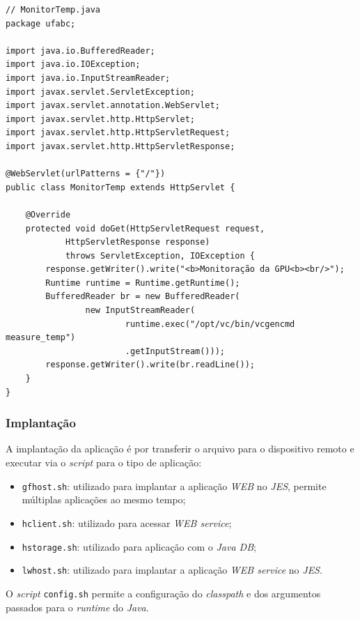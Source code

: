 \begin{verbatim}
// MonitorTemp.java
package ufabc;

import java.io.BufferedReader;
import java.io.IOException;
import java.io.InputStreamReader;
import javax.servlet.ServletException;
import javax.servlet.annotation.WebServlet;
import javax.servlet.http.HttpServlet;
import javax.servlet.http.HttpServletRequest;
import javax.servlet.http.HttpServletResponse;

@WebServlet(urlPatterns = {"/"})
public class MonitorTemp extends HttpServlet {

	@Override
	protected void doGet(HttpServletRequest request,
			HttpServletResponse response)
			throws ServletException, IOException {
		response.getWriter().write("<b>Monitoração da GPU<b><br/>");
		Runtime runtime = Runtime.getRuntime();
		BufferedReader br = new BufferedReader(
				new InputStreamReader(
						runtime.exec("/opt/vc/bin/vcgencmd measure_temp")
						.getInputStream()));
		response.getWriter().write(br.readLine());
	}
}
\end{verbatim}

\subsubsection{Implantação}

A implantação da aplicação é por transferir o arquivo para o dispositivo remoto 
e executar via o \textit{script} para o tipo de aplicação:

\begin{itemize}
    
    \item \verb|gfhost.sh|: utilizado para implantar a aplicação \textit{WEB} 
    no \textit{JES}, permite múltiplas aplicações ao mesmo tempo;
    
    \item \verb|hclient.sh|: utilizado para acessar \textit{WEB service};
    
    \item \verb|hstorage.sh|: utilizado para aplicação com o \textit{Java DB};
    
    \item \verb|lwhost.sh|: utilizado para implantar a aplicação \textit{WEB 
    service} no \textit{JES}.

\end{itemize}

O \textit{script} \verb|config.sh| permite a configuração do \textit{classpath} 
e dos argumentos passados para o \textit{runtime} do \textit{Java}.

